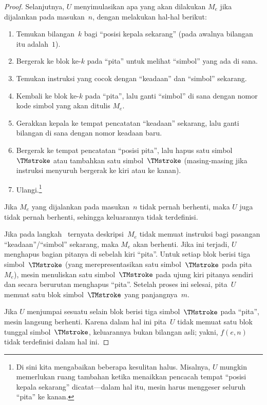 \documentclass[../../../include/open-logic-section]{subfiles}
\begin{document}
\begin{proof}
  Selanjutnya, $U$ menyimulasikan apa yang akan dilakukan $M_e$ jika
  dijalankan pada masukan~$n$, dengan melakukan hal-hal berikut:
  \begin{enumerate}
    \item Temukan bilangan~$k$ bagi ``posisi kepala sekarang'' (pada awalnya
    bilangan itu adalah~$1$).
    \item Bergerak ke blok ke-$k$ pada ``pita'' untuk melihat ``simbol'' yang
    ada di sana.
    \item{}%
    Temukan instruksi yang cocok dengan ``keadaan'' dan ``simbol'' sekarang.
    \item Kembali ke blok ke-$k$ pada ``pita'', lalu ganti ``simbol'' di sana
    dengan nomor kode simbol yang akan ditulis $M_e$.
    \item Gerakkan kepala ke tempat pencatatan ``keadaan'' sekarang, lalu
    ganti bilangan di sana dengan nomor keadaan baru.
    \item Bergerak ke tempat pencatatan ``posisi pita'', lalu hapus satu
    simbol~$\TMstroke$ atau tambahkan satu simbol~$\TMstroke$ (masing-masing
    jika instruksi menyuruh bergerak ke kiri atau ke kanan).
    \item Ulangi.\footnote{Di sini kita mengabaikan beberapa kesulitan halus.
    Misalnya, $U$ mungkin memerlukan ruang tambahan ketika menaikkan pencacah
    tempat ``posisi kepala sekarang'' dicatat---dalam hal itu, mesin harus
    menggeser seluruh ``pita'' ke kanan.}
  \end{enumerate}
  Jika $M_e$ yang dijalankan pada masukan~$n$ tidak pernah berhenti, maka $U$
  juga tidak pernah berhenti, sehingga keluarannya tidak terdefinisi.

  Jika pada langkah~ ternyata deskripsi~$M_e$ tidak memuat
  instruksi bagi pasangan ``keadaan''/``simbol'' sekarang, maka $M_e$ akan
  berhenti. Jika ini terjadi, $U$ menghapus bagian pitanya di sebelah kiri
  ``pita''. Untuk setiap blok berisi tiga simbol~$\TMstroke$ (yang
  merepresentasikan satu simbol~$\TMstroke$ pada pita~$M_e$), mesin menuliskan
  satu simbol~$\TMstroke$ pada ujung kiri pitanya sendiri dan secara berurutan
  menghapus ``pita''. Setelah proses ini selesai, pita~$U$ memuat satu blok
  simbol~$\TMstroke$ yang panjangnya~$m$.

  Jika $U$ menjumpai sesuatu selain blok berisi tiga simbol~$\TMstroke$ pada
  ``pita'', mesin langsung berhenti. Karena dalam hal ini pita~$U$ tidak memuat
  satu blok tunggal simbol~$\TMstroke$, keluarannya bukan bilangan asli; yakni,
  $f(e,n)$ tidak terdefinisi dalam hal ini.
\end{proof}
\end{document}
